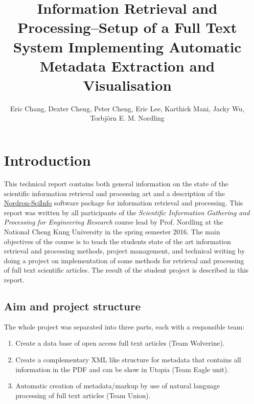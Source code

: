 \documentclass[a4paper,twocolumn,twoside]{article}
\begin{document}
 
	
	\title{Information Retrieval and Processing--Setup of a Full Text System Implementing Automatic Metadata Extraction and Visualisation}
	\author{Eric Chang, Dexter Cheng, Peter Cheng, Eric Lee, Karthick Mani, Jacky Wu,\\ Torbjörn E. M. Nordling}  %
	\maketitle   
	
	\section{Introduction}
	\label{Introduction}
	
	This technical report contains both general information on the state of the scientific information retrieval and processing art and a description of the \href{https://bitbucket.org/nordron/nordron-sciinfo}{Nordron-SciInfo} software package for information retrieval and processing. 
	This report was written by all participants of the \emph{Scientific Information Gathering and Processing for Engineering Research} course lead by Prof. Nordling at the National Cheng Kung University in the spring semester 2016. The main objectives of the course is to teach the students state of the art information retrieval and processing methods, project management, and technical writing by doing a project on implementation of some methods for retrieval and processing of full text scientific articles. The result of the student project is described in this report.
	
	\subsection{Aim and project structure}
	\label{aim}

	The whole project was separated into three parts, each with a responsible team:
	\begin{enumerate}
		\item Create a data base of open access full text articles (Team Wolverine).
		\item Create a complementary XML like structure for metadata that contains all information in the PDF and can be show in Utopia (Team Eagle unit).
		\item Automatic creation of metadata/markup by use of natural language processing of full text articles (Team Union).
	\end{enumerate}
	
\end{document}
